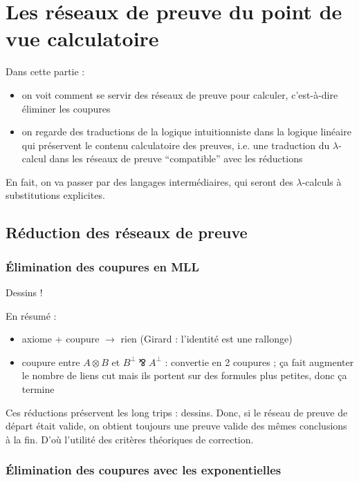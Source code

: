 \documentclass[a4paper, 11pt]{article}
\newcommand{\parr}{\mathbin{⅋}}
\begin{document}
\section{Les réseaux de preuve du point de vue calculatoire}

\newcommand{\lambdas}{{\lambda \mathtt{s}}}
\newcommand{\lambdalxr}{{\lambda \mathtt{l x r}}}

Dans cette partie :
\begin{itemize}
\item on voit comment se servir des réseaux de preuve pour calculer, c'est-à-dire éliminer les coupures
\item on regarde des traductions de la logique intuitionniste dans la logique linéaire qui préservent le contenu calculatoire des preuves, i.e. une traduction du $\lambda$-calcul dans les réseaux de preuve \enquote{compatible} avec les réductions
\end{itemize}

En fait, on va passer par des langages intermédiaires, qui seront des $\lambda$-calculs à substitutions explicites.

\subsection{Réduction des réseaux de preuve}

\subsubsection{Élimination des coupures en MLL}

Dessins !

En résumé :
\begin{itemize}
\item axiome + coupure $\to$ rien (Girard : l'identité est une rallonge)
\item coupure entre $A \otimes B$ et $B^\perp \parr A^\perp$ : convertie en 2 coupures ; ça fait augmenter le nombre de liens cut mais ils portent sur des formules plus petites, donc ça termine
\end{itemize}

Ces réductions préservent les long trips : dessins. Donc, si le réseau de preuve de départ était valide, on obtient toujours une preuve valide des mêmes conclusions à la fin. D'où l'utilité des critères théoriques de correction.

\subsubsection{Élimination des coupures avec les exponentielles}
\end{document}
